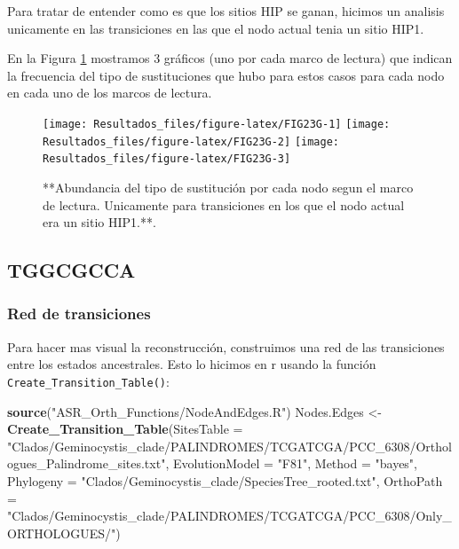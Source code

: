\documentclass[
]{book}
\newenvironment{Shaded}{\begin{snugshade}}{\end{snugshade}}
\newcommand{\AttributeTok}[1]{\textcolor[rgb]{0.13,0.29,0.53}{#1}}
\newcommand{\FunctionTok}[1]{\textcolor[rgb]{0.13,0.29,0.53}{\textbf{#1}}}
\newcommand{\NormalTok}[1]{#1}
\newcommand{\OtherTok}[1]{\textcolor[rgb]{0.56,0.35,0.01}{#1}}
\newcommand{\StringTok}[1]{\textcolor[rgb]{0.31,0.60,0.02}{#1}}
\begin{document}
Para tratar de entender como es que los sitios HIP se ganan, hicimos un analisis unicamente en las transiciones en las que el nodo actual tenia un sitio HIP1.

En la Figura \ref{fig:FIG23G} mostramos 3 gráficos (uno por cada marco de lectura) que indican la frecuencia del tipo de sustituciones que hubo para estos casos para cada nodo en cada uno de los marcos de lectura.

\begin{figure}

{\centering \texttt{[image: Resultados\_files/figure-latex/FIG23G-1]} \texttt{[image: Resultados\_files/figure-latex/FIG23G-2]} \texttt{[image: Resultados\_files/figure-latex/FIG23G-3]} 

}

\caption{**Abundancia del tipo de sustitución por cada nodo segun el marco de lectura. Unicamente para transiciones en los que el nodo actual era un sitio HIP1.**.}\label{fig:FIG23G}
\end{figure}

\hypertarget{tggcgcca-1}{%
\subsection{TGGCGCCA}\label{tggcgcca-1}}

\hypertarget{red-de-transiciones-4}{%
\subsubsection{Red de transiciones}\label{red-de-transiciones-4}}

Para hacer mas visual la reconstrucción, construimos una red de las transiciones entre los estados ancestrales. Esto lo hicimos en r usando la función \texttt{Create\_Transition\_Table()}:

\begin{Shaded}
\begin{Highlighting}[]
\FunctionTok{source}\NormalTok{(}\StringTok{"ASR\_Orth\_Functions/NodeAndEdges.R"}\NormalTok{)}
\NormalTok{Nodes.Edges }\OtherTok{\textless{}{-}} \FunctionTok{Create\_Transition\_Table}\NormalTok{(}\AttributeTok{SitesTable =} \StringTok{"Clados/Geminocystis\_clade/PALINDROMES/TCGATCGA/PCC\_6308/Orthologues\_Palindrome\_sites.txt"}\NormalTok{,}
                                \AttributeTok{EvolutionModel =} \StringTok{"F81"}\NormalTok{,}
                                \AttributeTok{Method =} \StringTok{"bayes"}\NormalTok{,}
                                \AttributeTok{Phylogeny =} \StringTok{"Clados/Geminocystis\_clade/SpeciesTree\_rooted.txt"}\NormalTok{,}
                                \AttributeTok{OrthoPath =} \StringTok{"Clados/Geminocystis\_clade/PALINDROMES/TCGATCGA/PCC\_6308/Only\_ORTHOLOGUES/"}\NormalTok{)}
\end{Highlighting}
\end{Shaded}
\end{document}
